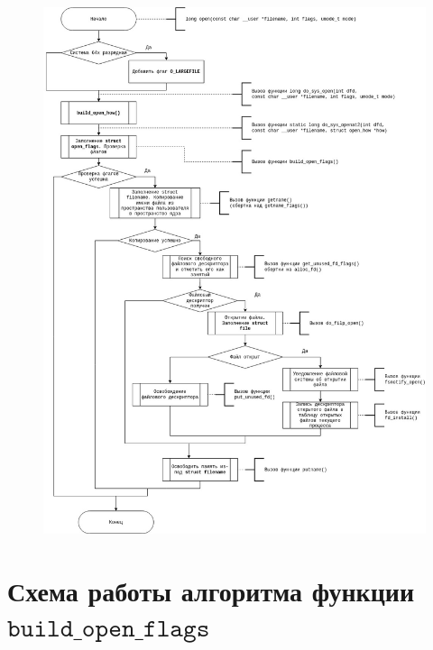 \documentclass[12pt]{report}
\begin{document}
\begin{figure}[H]
	\centering
	\includegraphics[scale=0.37]{img/open.jpg}
	\label{fig:open}
\end{figure}

\section{Схема работы алгоритма функции $\texttt{build\_open\_flags}$}
\end{document}

